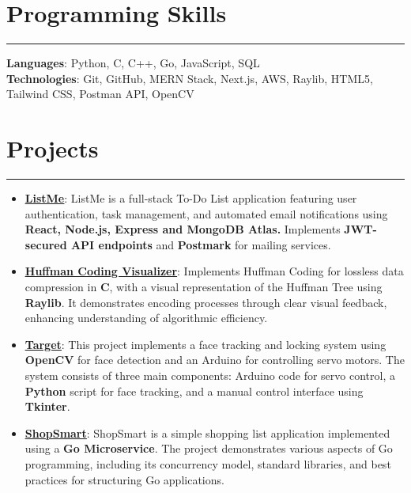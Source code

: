 \documentclass[a4paper,10pt]{article}
\begin{document}
\section*{Programming Skills}
\vspace{-.2em}
\hrule
\vspace{0.5em}

\textbf{Languages}: Python, C, C++, Go, JavaScript, SQL \vspace{0.5em} \\
\textbf{Technologies}: Git, GitHub, MERN Stack, Next.js, AWS, Raylib, HTML5, Tailwind CSS, Postman API, OpenCV

\section*{Projects}
\vspace{-.2em}
\hrule
\vspace{0.5em}

\begin{itemize}
    \item \textbf{\href{https://github.com/thearfa99/mern}{\underline{ListMe}}}: ListMe is a full-stack To-Do List application featuring user authentication, task management, and automated email notifications using \textbf{React, Node.js, Express and MongoDB Atlas.} Implements \textbf{JWT-secured API endpoints} and \textbf{Postmark} for mailing services.
    \item \textbf{\href{https://github.com/thearfa99/huft}{\underline{Huffman Coding Visualizer}}}: Implements Huffman Coding for lossless data compression in \textbf{C}, with a visual representation of the Huffman Tree using \textbf{Raylib}. It demonstrates encoding processes through clear visual feedback, enhancing understanding of algorithmic efficiency.
    \item \textbf{\href{https://github.com/thearfa99/tureet}{\underline{Target}}}: This project implements a face tracking and locking system using \textbf{OpenCV} for face detection and an Arduino for controlling servo motors. The system consists of three main components: Arduino code for servo control, a \textbf{Python} script for face tracking, and a manual control interface using \textbf{Tkinter}.
    \item \textbf{\href{https://github.com/thearfa99/ShopSmart}{\underline{ShopSmart}}}: ShopSmart is a simple shopping list application implemented using a \textbf{Go Microservice}. The project demonstrates various aspects of Go programming, including its concurrency model, standard libraries, and best practices for structuring Go applications.
\end{itemize}
\end{document}
